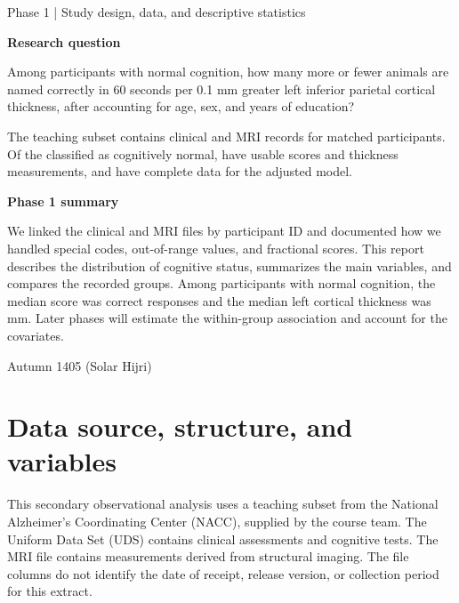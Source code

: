 \documentclass[11pt]{article}
\begin{document}
\vspace{9mm}

\vspace{3mm}
{\Large Phase 1 | Study design, data, and descriptive statistics\par}
\vspace{9mm}

{\large\bfseries Research question}\par
Among participants with normal cognition, how many more or fewer animals
are named correctly in 60 seconds per 0.1 mm greater left inferior
parietal cortical thickness, after accounting for age, sex, and years of
education?

\vspace{5mm}
\noindent\colorbox{ReportTint}{%
  \parbox{\dimexpr\linewidth-2\fboxsep\relax}{%
    \vspace{2mm}
    The teaching subset contains clinical and MRI records for \NMatched{}
    matched participants. Of the \NNormal{} classified as cognitively normal,
    \NPairedNormal{} have usable scores and thickness measurements, and
    \NModelNormal{} have complete data for the adjusted model.
    \vspace{2mm}
  }%
}

\vspace{5mm}
{\large\bfseries Phase 1 summary}\par
We linked the clinical and MRI files by participant ID and documented how
we handled special codes, out-of-range values, and fractional scores.
This report describes the distribution of cognitive status, summarizes
the main variables, and compares the recorded groups. Among participants
with normal cognition, the median score was \NormalScoreMedian{} correct
responses and the median left cortical thickness was
\NormalThicknessMedian{} mm. Later phases will estimate the within-group
association and account for the covariates.

\vfill
{\small Autumn 1405 (Solar Hijri)\par}
\clearpage

\section{Data source, structure, and variables}
This secondary observational analysis uses a teaching subset from the
National Alzheimer's Coordinating Center (NACC), supplied by the course
team. The Uniform Data Set (UDS) contains clinical assessments and
cognitive tests. The MRI file contains measurements derived from
structural imaging. The file columns do not identify the date of
receipt, release version, or collection period for this extract.
\end{document}
